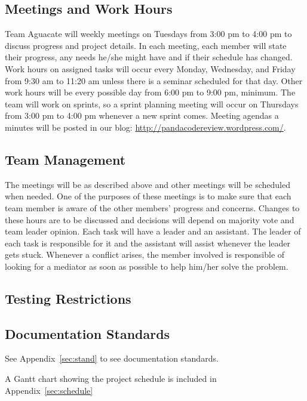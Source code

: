 
\subsection{Meetings and Work Hours}
Team Aguacate will weekly meetings on Tuesdays from 3:00 pm to 4:00 pm to discuss progress and project details. In each meeting, each member will state their progress, any needs he/she might have and if their schedule has changed. Work hours on assigned tasks will occur every Monday, Wednesday, and Friday from 9:30 am to 11:20 am unless there is a seminar scheduled for that day. Other work hours will be every possible day from 6:00 pm to 9:00 pm, minimum. The team will work on sprints, so a sprint planning meeting will occur on Thursdays from 3:00 pm to 4:00 pm whenever a new sprint comes.  Meeting agendas a minutes will be posted in our blog: \url{http://pandacodereview.wordpress.com/}.

\subsection{Team Management}
The meetings will be as described above and other meetings will be scheduled when needed. One of the purposes of these meetings is to make sure that each team member is aware of the other members' progress and concerns. Changes to these hours are to be discussed and decisions will depend on majority vote and team leader opinion. Each task will have a leader and an assistant. The leader of each task is responsible for it and the assistant will assist whenever the leader gets stuck. Whenever a conflict arises, the member involved is responsible of looking for a mediator as soon as possible to help him/her solve the problem. 

\subsection{Testing Restrictions}

\subsection{Documentation Standards}
See Appendix~\ref{sec:stand} to see documentation standards.

A Gantt chart showing the project schedule is included in Appendix~\ref{sec:schedule} 